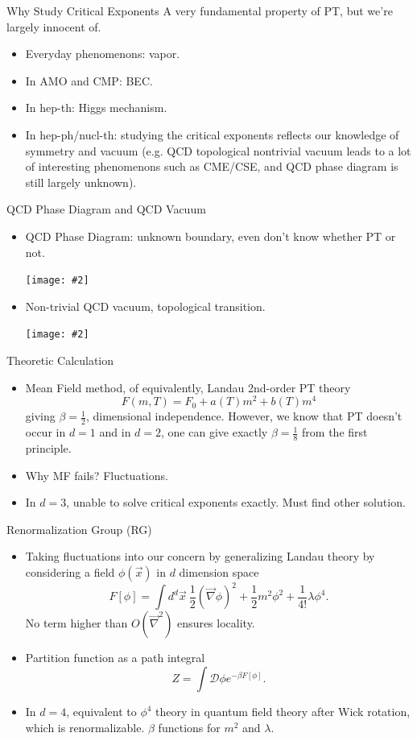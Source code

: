 \documentclass[aspectratio=1610,14pt]{beamer}
\newcommand{\del}{\vec \nabla}
\newcommand{\cpic}[2]{
\begin{center}
\texttt{[image: \#2]}
\end{center}
}
\begin{document}
\begin{frame}{Why Study Critical Exponents}
A very fundamental property of PT, but we're largely innocent of.
\begin{itemize}
\item
Everyday phenomenons: vapor.
\item
In AMO and CMP: BEC.
\item
In hep-th: Higgs mechanism.
\item
In hep-ph/nucl-th: studying the critical exponents reflects our knowledge of symmetry and vacuum (e.g. QCD topological nontrivial vacuum leads to a lot of interesting phenomenons such as CME/CSE, and QCD phase diagram is still largely unknown).
\end{itemize}
\end{frame}

\begin{frame}{QCD Phase Diagram and QCD Vacuum}
\begin{itemize}
\item
QCD Phase Diagram: unknown boundary, even don't know whether PT or not.
\cpic{0.17}{qcd_pd}
\item
Non-trivial QCD vacuum, topological transition.
\cpic{0.3}{qcd_vacuum}
\end{itemize}
\end{frame}

\begin{frame}{Theoretic Calculation}
\begin{itemize}
\item
Mean Field method, of equivalently, Landau 2nd-order PT theory
$$
F(m,T) = F_0 + a(T)m^2 + b(T)m^4
$$
giving $\beta = \frac{1}{2}$, dimensional independence. However, we know that PT doesn't occur in $d=1$ and in $d=2$, one can give exactly $\beta= \frac{1}{8}$ from the first principle.
\item
Why MF fails? Fluctuations.
\item
In $d=3$, unable to solve critical exponents exactly. Must find other solution.
\end{itemize}
\end{frame}

\begin{frame}{Renormalization Group (RG)}
\begin{itemize}
\item
Taking fluctuations into our concern by generalizing Landau theory by considering a field $\phi(\vec x)$ in $d$ dimension space
$$
F[\phi] = \int d^d \vec x \ \frac{1}{2}(\del \phi)^2 + \frac{1}{2}m^2 \phi^2 + \frac{1}{4!}\lambda \phi^4.
$$
No term higher than $O(\del ^2)$ ensures locality.
\item
Partition function as a path integral
$$
Z = \int \mathcal{D}\phi e^{-\beta F[\phi]}.
$$
\item
In $d=4$, equivalent to $\phi^4$ theory in quantum field theory after Wick rotation, which is renormalizable. $\beta$ functions for $m^2$ and $\lambda$.
\end{itemize}
\end{frame}
\end{document}
